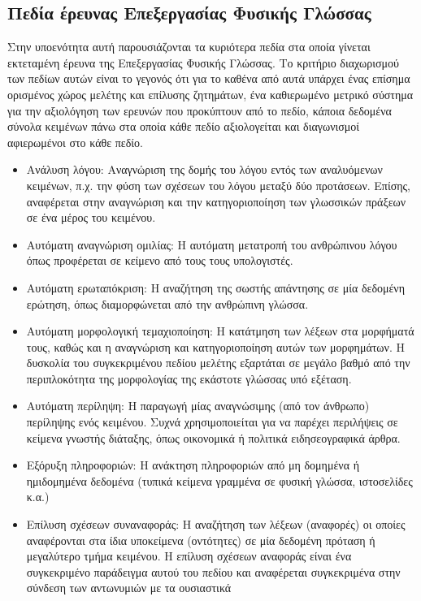 \subsection{Πεδία έρευνας Επεξεργασίας Φυσικής Γλώσσας}

Στην υποενότητα αυτή παρουσιάζονται τα κυριότερα πεδία στα οποία γίνεται εκτεταμένη έρευνα της Επεξεργασίας Φυσικής Γλώσσας. 
Το κριτήριο διαχωρισμού των πεδίων αυτών είναι το γεγονός ότι για το καθένα από αυτά υπάρχει ένας επίσημα ορισμένος χώρος 
μελέτης και επίλυσης ζητημάτων, ένα καθιερωμένο μετρικό σύστημα για την αξιολόγηση των ερευνών που προκύπτουν από το
πεδίο, κάποια δεδομένα σύνολα κειμένων πάνω στα οποία κάθε πεδίο αξιολογείται και διαγωνισμοί αφιερωμένοι στο κάθε πεδίο.
\begin{itemize}
 \item Ανάλυση λόγου: Αναγνώριση της δομής του λόγου εντός των αναλυόμενων κειμένων, π.χ. την φύση των σχέσεων του λόγου μεταξύ δύο προτάσεων. 
 Επίσης, αναφέρεται στην αναγνώριση και την κατηγοριοποίηση των γλωσσικών πράξεων σε ένα μέρος του κειμένου.
 \item Αυτόματη αναγνώριση ομιλίας: Η αυτόματη μετατροπή του ανθρώπινου λόγου όπως προφέρεται σε κείμενο από τους τους υπολογιστές.
 \item Αυτόματη ερωταπόκριση: Η αναζήτηση της σωστής απάντησης σε μία δεδομένη ερώτηση, όπως διαμορφώνεται από την ανθρώπινη γλώσσα.
 \item Αυτόματη μορφολογική τεμαχιοποίηση: Η κατάτμηση των λέξεων στα μορφήματά τους,
 καθώς και η αναγνώριση και κατηγοριοποίηση αυτών των μορφημάτων. 
 Η δυσκολία του συγκεκριμένου πεδίου μελέτης εξαρτάται σε μεγάλο βαθμό 
 από την περιπλοκότητα της μορφολογίας της εκάστοτε γλώσσας υπό εξέταση.
 \item Αυτόματη περίληψη: Η παραγωγή μίας αναγνώσιμης (από τον άνθρωπο) περίληψης ενός κειμένου. 
 Συχνά χρησιμοποιείται για να παρέχει περιλήψεις σε κείμενα γνωστής διάταξης, 
 όπως οικονομικά ή πολιτικά ειδησεογραφικά άρθρα.
 \item Εξόρυξη πληροφοριών: Η ανάκτηση πληροφοριών από μη δομημένα ή ημιδομημένα δεδομένα 
 (τυπικά κείμενα γραμμένα σε φυσική γλώσσα, ιστοσελίδες κ.α.)
 \item Επίλυση σχέσεων συναναφοράς: Η αναζήτηση των λέξεων (αναφορές) 
 οι οποίες αναφέρονται στα ίδια υποκείμενα (οντότητες) σε μία δεδομένη πρόταση ή μεγαλύτερο τμήμα κειμένου. 
 Η επίλυση σχέσεων αναφοράς είναι ένα συγκεκριμένο παράδειγμα αυτού του πεδίου 
 και αναφέρεται συγκεκριμένα στην σύνδεση των αντωνυμιών με τα ουσιαστικά 

\end{itemize}
